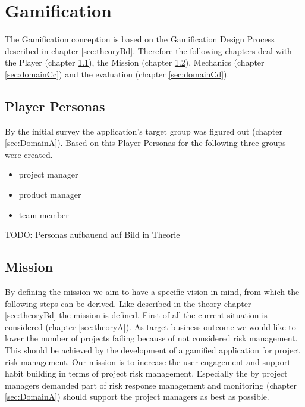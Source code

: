 
\section{Gamification}
\label{sec:domainC}


The Gamification conception is based on the Gamification Design Process described in chapter \ref{sec:theoryBd}. Therefore the following chapters deal with the Player (chapter \ref{sec:domainCa}), the Mission (chapter \ref{sec:domainCb}), Mechanics (chapter \ref{sec:domainCc}) and the evaluation (chapter \ref{sec:domainCd}).

\subsection{Player Personas}
\label{sec:domainCa}

By the initial survey the application's target group was figured out (chapter \ref{sec:DomainA}). Based on this Player Personas for the following three groups were created.

\begin{itemize}
	\item project manager
	\item product manager
	\item team member
\end{itemize}

TODO: Personas aufbauend auf Bild in Theorie

\subsection{Mission}
\label{sec:domainCb}

By defining the mission we aim to have a specific vision in mind, from which the following steps can be derived. Like described in the theory chapter \ref{sec:theoryBd} the mission is defined. 
First of all the current situation is considered (chapter \ref{sec:theoryA}). As target business outcome we would like to lower the number of projects failing because of not considered risk management. This should be achieved by the development of a gamified application for project risk management.
Our mission is to increase the user engagement and support habit building in terms of project risk management. Especially the by project managers demanded part of risk response management and monitoring (chapter \ref{sec:DomainA}) should support the project managers as best as possible.

